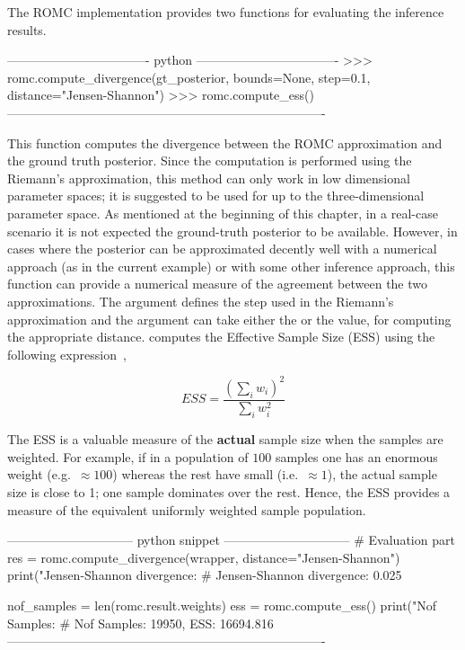 The ROMC implementation provides two functions for evaluating the
inference results.

\begin{Code}
---------------------------------- python ----------------------------------  
>>> romc.compute_divergence(gt_posterior,
                            bounds=None,
                            step=0.1,
                            distance="Jensen-Shannon")
>>> romc.compute_ess()
----------------------------------------------------------------------------
\end{Code}

\noindent
This function computes the divergence between the ROMC approximation
and the ground truth posterior. Since the computation is performed
using the Riemann's approximation, this method can only work in low
dimensional parameter spaces; it is suggested to be used for up to the
three-dimensional parameter space. As mentioned at the beginning of
this chapter, in a real-case scenario it is not expected the
ground-truth posterior to be available. However, in cases where the
posterior can be approximated decently well with a numerical approach
(as in the current example) or with some other inference approach,
this function can provide a numerical measure of the agreement between
the two approximations. The argument  defines the step used
in the Riemann's approximation and the argument  can
take either the  or the 
value, for computing the appropriate distance. 
computes the Effective Sample Size (ESS) using the following
expression~\cite{Sudman1967},

\begin{equation} \label{eq:ESS}
  ESS = \frac{(\sum_i w_i)^2}{\sum_i w_i^2}
\end{equation}

The ESS is a valuable measure of the \textbf{actual} sample size when
the samples are weighted. For example, if in a population of $100$
samples one has an enormous weight (e.g.\ $\approx 100$) whereas the
rest have small (i.e.\ $\approx 1$), the actual sample size is close
to 1; one sample dominates over the rest. Hence, the ESS provides a
measure of the equivalent uniformly weighted sample population.

\begin{Code}
------------------------------ python snippet ------------------------------  
  # Evaluation part
  res = romc.compute_divergence(wrapper, distance="Jensen-Shannon")                                 
  print("Jensen-Shannon divergence: %
  # Jensen-Shannon divergence: 0.025

  nof_samples = len(romc.result.weights)
  ess = romc.compute_ess()
  print("Nof Samples: %
  # Nof Samples: 19950, ESS: 16694.816
----------------------------------------------------------------------------  
\end{Code}
